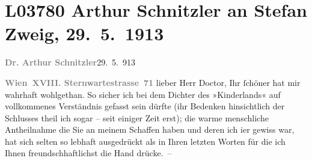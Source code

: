 

\section[Arthur Schnitzler an Stefan Zweig, 29. 5. 1913]{L03780 Arthur Schnitzler an Stefan Zweig, 29. 5. 1913}
\nopagebreak{}
\rehead{ }\normalsize\beginnumbering{}
\toendnotes[C]{\smallbreak\pagebreak[2]}
\toendnotes[C]{\smallbreak}
\pstart
           {\pb}\textcolor{gray}{\textbf{Dr. Arthur Schnitzler}}\hfill 29. 5. 913\pend
           
\pstart
           \textcolor{gray}{\textbf{Wien XVIII. Sternwartestrasse 71}}\pend
           \vspace{0.5em}
\pstart
           lieber Herr Doctor, Ihr ſchöner \label{K_L03780-1v}\label{K_L03780-1} hat mir wahrhaft wohlgethan.
               So sicher ich bei dem Dichter des »Kinderlands«
               auf vollkommenes Verständnis gefasst sein dürfte (ihr Bedenken hinsichtlich der
               Schlusses theil ich sogar – seit einiger Zeit erst); die warme menschliche
               Antheilnahme die Sie an meinem Schaffen haben und deren ich i{\geminationm}er gewiss war, hat
               sich selten so lebhaft ausgedrückt als in Ihren letzten Worten für die ich Ihnen
               freundschhaftlichst die Hand drücke. –\pend
           
